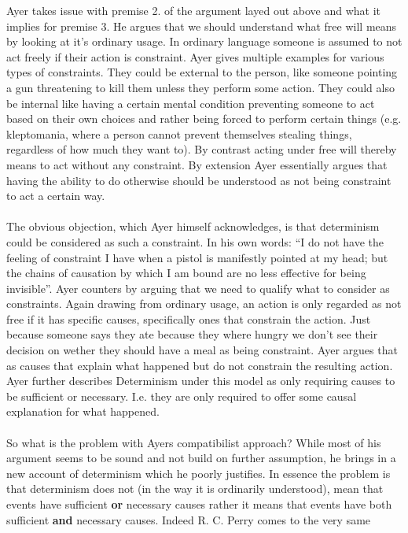 \documentclass[14pt]{article}
\begin{document}
Ayer takes issue with premise 2. of the argument layed out above and what it implies for premise
3. He argues that we should understand what free will means by looking at it's ordinary usage.
In ordinary language someone is assumed to not act freely if their action is constraint.
Ayer gives multiple examples for various types of constraints.
They could be external to the person, like someone pointing a gun threatening to kill them unless they perform
some action. They could also be internal like having a certain mental condition preventing someone to act
based on their own choices and rather being forced to perform certain things (e.g. kleptomania, where a person
cannot prevent themselves stealing things, regardless of how much they want to).
By contrast acting under free will thereby means to act without any constraint. By extension
Ayer essentially argues that having the ability to do otherwise should be understood as not being constraint
to act a certain way.\\
\\
The obvious objection, which Ayer himself acknowledges,
is that determinism could be considered as such a constraint.
In his own words: “I do not have the feeling of constraint I have when a pistol
is manifestly pointed at my head; but the chains of causation by which I am bound are no less
effective for being invisible”\autocite[145]{Ayer}.
Ayer counters by arguing that we need to qualify what to consider as constraints.
Again drawing from ordinary usage, an action is only regarded
as not free if it has specific causes, specifically ones that constrain the action.
Just because someone says they ate because they where hungry we don't see their
decision on wether they should have a meal as being constraint.
Ayer argues that as causes that explain what happened but do not constrain the resulting action.
Ayer further describes Determinism under this model as only requiring causes to be sufficient or necessary.
I.e. they are only required to offer some causal explanation for what happened.\\
\\
So what is the problem with Ayers compatibilist approach?
While most of his argument seems to be sound and not build
on further assumption, he brings in a new account of
determinism which he poorly justifies. In essence the problem
is that determinism does not (in the way it is ordinarily understood),
mean that events have sufficient \textbf{or} necessary causes rather it means that events have both sufficient
\textbf{and} necessary causes. Indeed R. C. Perry comes to the very same 
\end{document}
